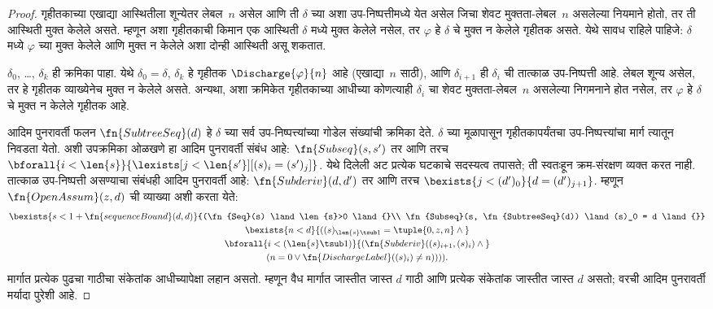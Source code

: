 \begin{proof}
  गृहीतकाच्या एखाद्या आस्थितीला शून्येतर लेबल~$n$ असेल आणि ती
  $\delta$ च्या अशा उप-निष्पत्तीमध्ये येत असेल जिचा शेवट
  मुक्तता-लेबल~$n$ असलेल्या नियमाने होतो, तर ती आस्थिती
  मुक्त केलेले असते. म्हणून अशा गृहीतकाची किमान एक आस्थिती
  $\delta$ मध्ये मुक्त केलेले नसेल, तर $\varphi$ हे
  $\delta$ चे मुक्त न केलेले गृहीतक असते. येथे सावध राहिले
  पाहिजे: $\delta$ मध्ये $\varphi$ च्या मुक्त केलेले आणि
  मुक्त न केलेले अशा दोन्ही आस्थिती असू शकतात.

  $\delta_0$, \dots, $\delta_k$ ही क्रमिका पाहा. येथे $\delta_0 =
  \delta$, $\delta_k$ हे गृहीतक $\Discharge{\varphi}{n}$ आहे
  (एखाद्या~$n$ साठी), आणि $\delta_{i+1}$ ही $\delta_i$ ची तात्काळ
  उप-निष्पत्ती आहे. लेबल शून्य असेल, तर हे गृहीतक व्याख्येनेच
  मुक्त न केलेले असते. अन्यथा, अशा क्रमिकेत गृहीतकाच्या आधीच्या कोणत्याही
  $\delta_i$ चा शेवट मुक्तता-लेबल~$n$ असलेल्या निगमनाने होत नसेल,
  तर $\varphi$ हे $\delta$ चे मुक्त न केलेले गृहीतक आहे.

  आदिम पुनरावर्ती फलन $\fn{SubtreeSeq}(d)$ हे $\delta$ च्या
  सर्व उप-निष्पत्त्यांच्या गोडेल संख्यांची क्रमिका देते.
  $\delta$ च्या मूळापासून गृहीतकापर्यंतचा उप-निष्पत्त्यांचा मार्ग त्यातून
  निवडता येतो. अशी उपक्रमिका ओळखणे हा आदिम पुनरावर्ती संबंध आहे:
  $\fn{Subseq}(s, s')$ तर आणि तरच
  $\bforall{i<\len{s}}{\lexists[j<\len{s'}][(s)_i = (s')_j]}$.
  येथे दिलेली अट प्रत्येक घटकाचे सदस्यत्व तपासते; ती स्वतःहून
  क्रम-संरक्षण व्यक्त करत नाही. तात्काळ उप-निष्पत्ती असण्याचा
  संबंधही आदिम पुनरावर्ती आहे: $\fn{Subderiv}(d, d')$ तर आणि तरच
  $\bexists{j<(d')_0}{d = (d')_{j+1}}$. म्हणून
  $\fn{OpenAssum}(z, d)$ ची व्याख्या अशी करता येते:
  \begin{multline*}
    \bexists{s<1+\fn{sequenceBound}(d,d)}{(\fn{Seq}(s) \land \len{s}>0 \land {}\\
      \fn{Subseq}(s, \fn{SubtreeSeq}(d))
      \land (s)_0 = d \land {}} \\
    \bexists{n<d}{((s)_{\len{s} \tsub 1} = \tuple{0, z, n} \land {}}\\
      \bforall{i<(\len{s} \tsub 1)}{(\fn{Subderiv}((s)_{i+1}, (s)_i) \land {}}\\
      (n=0 \lor \fn{DischargeLabel}((s)_i) \neq n)))).
  \end{multline*}
मार्गात प्रत्येक पुढचा गाठीचा संकेतांक आधीच्यापेक्षा लहान असतो.
म्हणून वैध मार्गात जास्तीत जास्त $d$ गाठी आणि प्रत्येक संकेतांक
जास्तीत जास्त $d$ असतो; वरची आदिम पुनरावर्ती मर्यादा पुरेशी आहे.

\end{proof}

